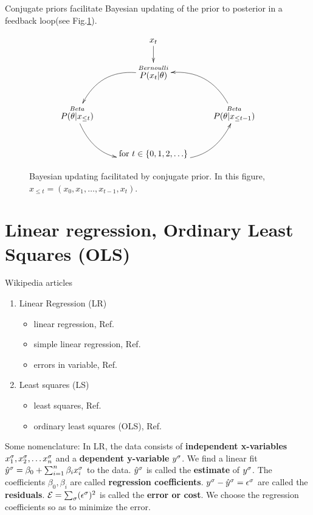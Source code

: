 Conjugate priors facilitate  
Bayesian updating 
of the prior to 
posterior in a 
feedback loop(see Fig.\ref{fig-conj-prior}).

\begin{figure}[h!]
$$\xymatrix{
&x_t\ar[d]
\\
&\stackrel{Bernoulli}{P(x_t|\theta)}\ar@/_2pc/[ld]
\\
\stackrel{Beta}{P(\theta|x_{\leq t})}\ar@/_2pc/[rd]
&&\stackrel{Beta}{P(\theta|x_{\leq t-1})}\ar@/_2pc/[ul]
\\
&\text{for } t\in\{0, 1, 2,\ldots\}
\ar@/_2pc/[ur]
}$$
\caption{Bayesian updating facilitated
by conjugate prior. In this figure,
$x_{\leq t}=(x_0, x_1, \ldots, x_{t-1}, x_t)$.}
\label{fig-conj-prior}
\end{figure}



\section{Linear regression, Ordinary Least Squares (OLS)}
\label{sec-conv-lr}
Wikipedia articles
\begin{enumerate}
\item
Linear Regression (LR)
\begin{itemize}
\item
linear regression, Ref.\cite{wiki-lr}
\item
 simple linear regression, Ref.\cite{wiki-slr}
\item
errors in variable, Ref.\cite{wiki-errors-in-iv}

\end{itemize}
\item
Least squares (LS)
\begin{itemize}
\item
least squares, Ref.\cite{wiki-ls}
\item
ordinary least squares (OLS), Ref.\cite{wiki-ols}
\end{itemize}
\end{enumerate}


Some nomenclature: In LR, the 
data consists of 
{\bf independent x-variables} $x^\sigma_1,
 x^\sigma_2, \ldots x^\sigma_n$ 
and a {\bf dependent y-variable} $y^\sigma$.
We find a linear fit ${\hat{y}}^\sigma =
\beta_0 + \sum_{i=1}^n \beta_i x^\sigma_i$
to the data. 
${\hat{y}}^\sigma$ is called the {\bf estimate}
of $y^\sigma$.
 The coefficients $\beta_0, \beta_i$
are called {\bf regression coefficients}.
$y^\sigma-{\hat{y}}^\sigma=\epsilon^\sigma$
are called  the {\bf residuals}.
${\cal E} =\sum_\sigma (\epsilon^\sigma)^2$
is called the {\bf error or cost}. We choose the 
regression coefficients
so as to minimize the error.

